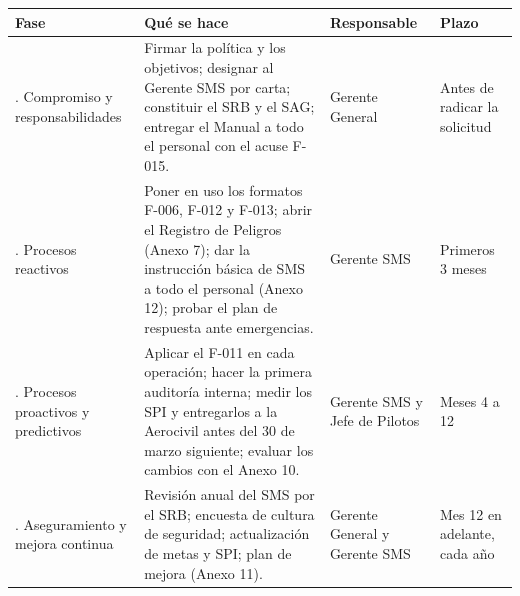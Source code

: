 \renewcommand{\arraystretch}{1.25}
\begin{center}
\begin{tabular}{|>{\RaggedRight\arraybackslash}p{2.9cm}|>{\RaggedRight\arraybackslash}p{7.3cm}|>{\RaggedRight\arraybackslash}p{2.5cm}|>{\RaggedRight\arraybackslash}p{2.4cm}|}
\hline
\rowcolor[gray]{0.9}\textbf{Fase} & \textbf{Qué se hace} & \textbf{Responsable} & \textbf{Plazo} \\ \hline
1. Compromiso y responsabilidades & Firmar la política y los objetivos; designar al Gerente SMS por carta; constituir el SRB y el SAG; entregar el Manual a todo el personal con el acuse F-015. & Gerente General & Antes de radicar la solicitud \\ \hline
2. Procesos reactivos & Poner en uso los formatos F-006, F-012 y F-013; abrir el Registro de Peligros (Anexo 7); dar la instrucción básica de SMS a todo el personal (Anexo 12); probar el plan de respuesta ante emergencias. & Gerente SMS & Primeros 3 meses \\ \hline
3. Procesos proactivos y predictivos & Aplicar el F-011 en cada operación; hacer la primera auditoría interna; medir los SPI y entregarlos a la Aerocivil antes del 30 de marzo siguiente; evaluar los cambios con el Anexo 10. & Gerente SMS y Jefe de Pilotos & Meses 4 a 12 \\ \hline
4. Aseguramiento y mejora continua & Revisión anual del SMS por el SRB; encuesta de cultura de seguridad; actualización de metas y SPI; plan de mejora (Anexo 11). & Gerente General y Gerente SMS & Mes 12 en adelante, cada año \\ \hline
\end{tabular}
\end{center}
